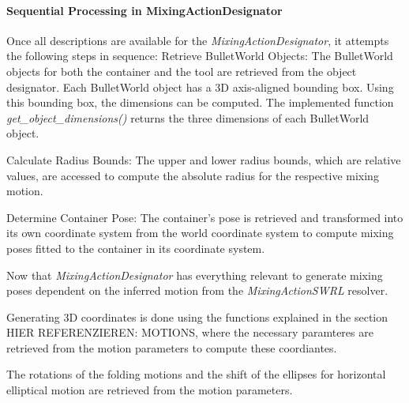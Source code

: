 \paragraph*{Sequential Processing in MixingActionDesignator}
Once all descriptions are available for the \textit{MixingActionDesignator}, it attempts the following steps in sequence:
Retrieve BulletWorld Objects:
    The BulletWorld objects for both the container and the tool are retrieved from the object designator. 
    Each BulletWorld object has a 3D axis-aligned bounding box. Using this bounding box, the dimensions can be computed. 
    The implemented function \textit{get\_object\_dimensions()} returns the three dimensions of each BulletWorld object.

Calculate Radius Bounds:
    The upper and lower radius bounds, which are relative values, are accessed to compute the absolute radius for the respective mixing motion.

Determine Container Pose:
    The container's pose is retrieved and transformed into its own coordinate system from the world coordinate system to compute mixing poses fitted to the container in its coordinate system.

Now that \textit{MixingActionDesignator} has everything relevant to generate mixing poses dependent on the inferred motion
from the \textit{MixingActionSWRL} resolver.

Generating 3D coordinates is done using the functions explained in the section HIER REFERENZIEREN: MOTIONS,
where the necessary paramteres are retrieved from the motion parameters to compute these coordiantes.

The rotations of the folding motions and the shift of the ellipses for horizontal elliptical motion are retrieved from the motion parameters. 